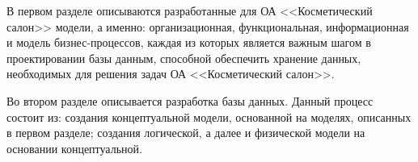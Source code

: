 В первом разделе описываются разработанные для ОА <<Косметический салон>> модели,
а именно: организационная, функциональная, информационная и модель бизнес-процессов,
каждая из которых является важным шагом в проектировании базы данным,
способной обеспечить хранение данных, необходимых для решения задач ОА <<Косметический салон>>.

Во втором разделе описывается разработка базы данных.
Данный процесс состоит из: создания концептуальной модели, основанной на моделях, описанных в первом разделе;
создания логической, а далее и физической модели на основании концептуальной.

\newpage
